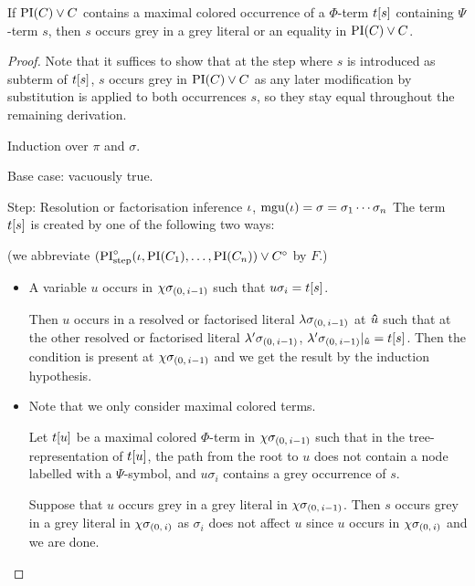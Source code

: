 \documentclass[,%
	draft=false,%
	numbers=noendperiod
	12pt,
	a4paper,
	oneside,%
	openany,
]{memoir}
\newcommand{\inv}{\ensuremath{\chi}}
\begin{document}
\begin{lemma}
	\label{lemma:subterm_in_grey_lit}
	If ${\operatorname{PI}(C) \lor C}$ contains a maximal colored occurrence of a $\Phi$-term $t[s]$ containing $\Psi$-term $s$, then 
	$s$ occurs grey in a grey literal or an equality in $\operatorname{PI}(C) \lor C$.
\end{lemma}
\begin{proof}
	Note that it suffices to show that at the step where $s$ is introduced as subterm of $t[s]$, $s$ occurs grey in $\operatorname{PI}(C) \lor C$ as any later modification by substitution is applied to both occurrences $s$, so they stay equal throughout the remaining derivation.
	\medskip

	\noindent
	Induction over $\pi$ and $\sigma$. 
	\medskip

	\noindent
	Base case: vacuously true.
	\medskip

	\noindent
	Step:
	Resolution or factorisation inference $\iota$, $\operatorname{mgu}(\iota) = \sigma = \sigma_1\cdots\sigma_n$ 
	The term $t[s]$ is created by one of the following two ways: 

	(we abbreviate 
	$(\operatorname{PI}^{\circ}_{\mathrm{step}}(\iota, \operatorname{PI}(C_1), \dots, \operatorname{PI}(C_n)) \lor C^\circ$ by $F$.)
	\begin{itemize}
		\item
			A variable $u$ occurs in $\inv\sigmazmi$ such that $u\sigma_i = t[s]$.

			Then $u$ occurs in a resolved or factorised literal $\lambda\sigma_{(0,\,i-1)}$ at $\bm\hat u$ such that at the other resolved or factorised literal $\lambda'\sigma_{(0,\,i-1)}$, $\lambda'\sigma_{(0,\,i-1)}|_{\bm\hat u} = t[s]$.
			Then the condition is present at $\inv\sigmazmi$ and we get the result by the induction hypothesis.

		\item 
			Note that we only consider maximal colored terms.

			Let $t[u]$ be a maximal colored $\Phi$-term in $\inv\sigmazmi$ such that in the tree-representation of $t[u]$, the path from the root to $u$ does not contain a node labelled with a $\Psi$-symbol, and $u\sigma_i$ contains a grey occurrence of $s$.


			Suppose that $u$ occurs grey in a grey literal in $\inv\sigmazmi$.
			Then $s$ occurs grey in a grey literal in $\inv\sigmazi$ as $\sigma_i$ does not affect $u$ since $u$ occurs in $\inv\sigmazi$ and we are done.


\end{itemize}
\end{proof}
\end{document}
